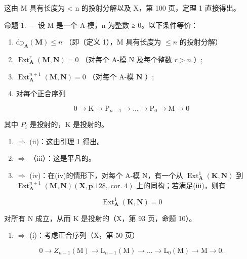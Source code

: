这由 M 具有长度为 \textless{} n 的投射分解以及 X，第 100 页，定理 1 直接得出。

命题 1. --- 设 M 是一个 A-模，n 为整数 ≥ 0。以下条件等价：

\begin{enumerate}
\def\labelenumi{(\roman{enumi})}
\item
  \(\mathrm{dp}_{\mathbf{A}}(\mathbf{M}) \leqslant n\) （即（定义 1），M 具有长度为 \(\leqslant n\) 的投射分解）
\item
  \(\operatorname{Ext}_{\mathbf{A}}^{r}(\mathbf{M},\mathbf{N}) = 0\) （对每个 A-模 N 及每个整数 \(r > n\) ）;
\item
  \(\operatorname{Ext}_{\mathbf{A}}^{n+1}(\mathbf{M}, \mathbf{N}) = 0\) （对每个 A-模 \(\mathbf{N}\) ）;
\item
  对每个正合序列
\end{enumerate}

\[
0 \rightarrow \mathrm{K} \rightarrow \mathrm{P} _ {n - 1} \rightarrow \dots \rightarrow \mathrm{P} _ {0} \rightarrow \mathrm{M} \rightarrow 0
\]

其中 \(P_{i}\) 是投射的，K 是投射的。

\begin{enumerate}
\def\labelenumi{(\roman{enumi})}
\item
  \(\Rightarrow\) (ii)：这由引理 1 得出。
\item
  \(\Rightarrow\) （iii）：这是平凡的。
\item
  \(\Rightarrow\) (iv)：在(iv)的情形下，对每个 A-模 N，有一个从 \(\operatorname{Ext}_{\mathbf{A}}^{1}(\mathbf{K},\mathbf{N})\) 到 \(\operatorname{Ext}_{\mathbf{A}}^{n + 1}(\mathbf{M},\mathbf{N})(\mathbf{X},\mathbf{p}.128,\operatorname{cor.}4)\) 上的同构；若满足(iii)，则有
\end{enumerate}

\[
\operatorname{Ext} _ {\mathbf {A}} ^ {1} (\mathbf {K}, \mathbf {N}) = 0
\]

对所有 N 成立，从而 K 是投射的（X，第 93 页，命题 10）。

\begin{enumerate}
\def\labelenumi{(\roman{enumi})}
\setcounter{enumi}{3}
\tightlist
\item
  \(\Rightarrow\) (i)：考虑正合序列（X，第 50 页）
\end{enumerate}

\[
0 \to Z _ {n - 1} (\mathrm{M}) \to \mathrm{L} _ {n - 1} (\mathrm{M}) \to \dots \to \mathrm{L} _ {0} (\mathrm{M}) \to \mathrm{M} \to 0.
\]

